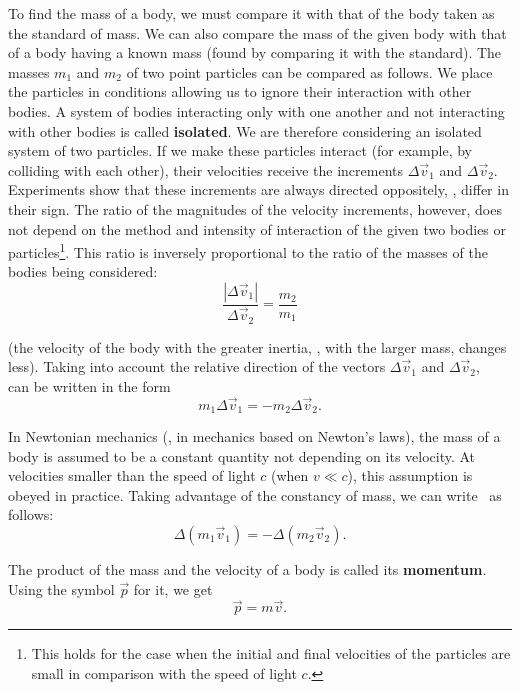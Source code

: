 To find the mass of a body, we must compare it with that of the body taken as the standard of mass. We can also compare the mass of the given body with that of a body having a known mass (found by comparing it with the standard). The masses $m_1$ and $m_2$ of two point particles can be compared as follows. We place the particles in conditions allowing us to ignore their interaction with other bodies. A system of bodies interacting only with one another and not interacting with other bodies is called \textbf{isolated}. We are therefore considering an isolated system of two particles. If we make these particles interact (for example, by colliding with each other), their velocities receive the increments $\Delta\vec{v}_1$ and $\Delta\vec{v}_2$. Experiments show that these increments are always directed oppositely, \ie, differ in their sign. The ratio of the magnitudes of the velocity increments, however, does not depend on the method and intensity of interaction of the given two bodies or particles\footnote{This holds for the case when the initial and final velocities of the particles are small in comparison with the speed of light $c$.}. This ratio is inversely proportional to the ratio of the masses of the bodies being considered:
\vspace{-10pt}
\begin{equation}\label{eq:2_1}
\frac{|\Delta\vec{v}_1|}{\Delta\vec{v}_2} = \frac{m_2}{m_1}
\end{equation}

\noindent
(the velocity of the body with the greater inertia, \ie, with the larger mass, changes less). Taking into account the relative direction of the vectors $\Delta\vec{v}_1$ and $\Delta\vec{v}_2$,~ can be written in the form
\begin{equation}\label{eq:2_2}
m_1 \Delta\vec{v}_1 = - m_2 \Delta\vec{v}_2.
\end{equation}

In Newtonian mechanics (\ie, in mechanics based on Newton's laws), the mass of a body is assumed to be a constant quantity not depending on its velocity. At velocities smaller than the speed of light $c$ (when $v\ll c$), this assumption is obeyed in practice. Taking advantage of the constancy of mass, we can write~ as follows:
\begin{equation}\label{eq:2_3}
\Delta(m_1 \vec{v}_1) = - \Delta(m_2 \vec{v}_2).
\end{equation}

The product of the mass and the velocity of a body is called its \textbf{momentum}. Using the symbol $\vec{p}$ for it, we get
\begin{equation}\label{eq:2_4}
\vec{p} = m \vec{v}.
\end{equation}

